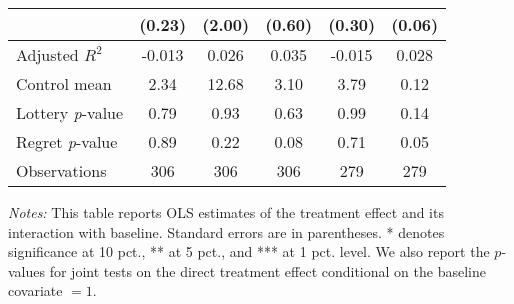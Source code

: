 \begin{table}[htbp]
{\begin{threeparttable}
\begin{tabular}{l*{5}{c}}
                &   (0.23)         &   (2.00)         &   (0.60)         &   (0.30)         &   (0.06)         \\
\midrule
Adjusted \(R^{2}\)&   -0.013         &    0.026         &    0.035         &   -0.015         &    0.028         \\
Control mean    &     2.34         &    12.68         &     3.10         &     3.79         &     0.12         \\
Lottery \emph{p}-value&     0.79         &     0.93         &     0.63         &     0.99         &     0.14         \\
Regret \emph{p}-value&     0.89         &     0.22         &     0.08         &     0.71         &     0.05         \\
Observations    &      306         &      306         &      306         &      279         &      279         \\
\bottomrule \end{tabular} \begin{tablenotes}[flushleft] \footnotesize \item \emph{Notes:} This table reports OLS estimates of the treatment effect and its interaction with baseline. Standard errors are in parentheses. * denotes significance at 10 pct., ** at 5 pct., and *** at 1 pct. level. We also report the \(p\)-values for joint tests on the direct treatment effect conditional on the baseline covariate $= 1$. \end{tablenotes} \end{threeparttable} } \end{table}
